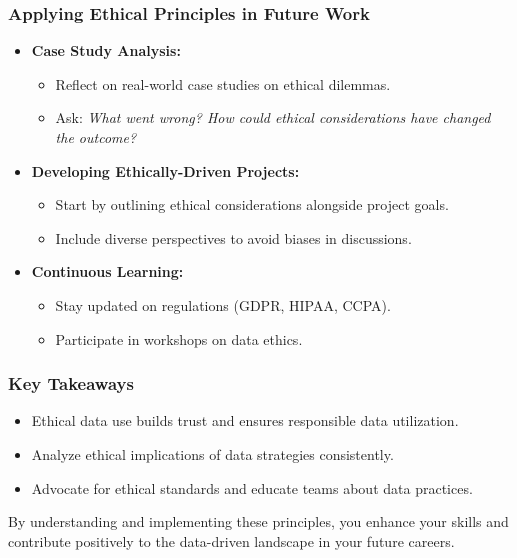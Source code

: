 \documentclass[aspectratio=169]{beamer}
\begin{document}
\begin{frame}[fragile]
    \frametitle{Applying Ethical Principles in Future Work}
    \begin{itemize}
        \item \textbf{Case Study Analysis:}
        \begin{itemize}
            \item Reflect on real-world case studies on ethical dilemmas.
            \item Ask: \textit{What went wrong? How could ethical considerations have changed the outcome?}
        \end{itemize}

        \item \textbf{Developing Ethically-Driven Projects:}
        \begin{itemize}
            \item Start by outlining ethical considerations alongside project goals.
            \item Include diverse perspectives to avoid biases in discussions.
        \end{itemize}

        \item \textbf{Continuous Learning:}
        \begin{itemize}
            \item Stay updated on regulations (GDPR, HIPAA, CCPA).
            \item Participate in workshops on data ethics.
        \end{itemize}
    \end{itemize}
\end{frame}

\begin{frame}[fragile]
    \frametitle{Key Takeaways}
    \begin{itemize}
        \item Ethical data use builds trust and ensures responsible data utilization.
        \item Analyze ethical implications of data strategies consistently.
        \item Advocate for ethical standards and educate teams about data practices.
    \end{itemize}

    By understanding and implementing these principles, you enhance your skills and contribute positively to the data-driven landscape in your future careers.
\end{frame}
\end{document}
